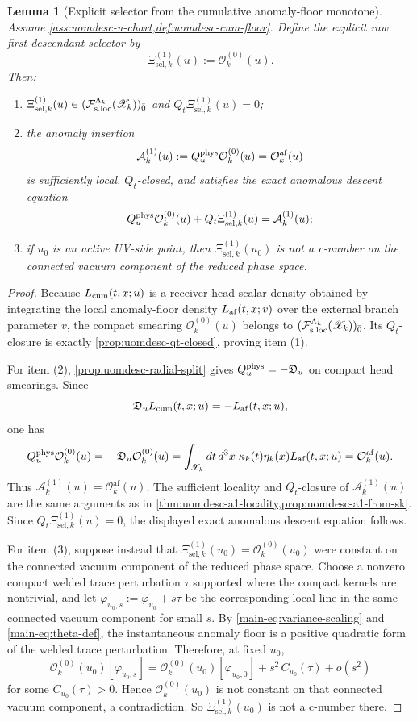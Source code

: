 \documentclass[11pt]{article}
\theoremstyle{definition}
\theoremstyle{plain}
\newtheorem{lemma}[definition]{Lemma}
\theoremstyle{remark}
\newcommand{\Fsloc}{\mathcal F_{\rm s.loc}}
\newcommand{\Xscr}{\mathscr X}
\newcommand{\Ozero}{\mathcal O^{(0)}}
\newcommand{\Oaf}{\mathcal O^{\mathrm{af}}}
\newcommand{\Aone}{\mathcal A^{(1)}}
\newcommand{\Xiselk}{\Xi^{(1)}_{\mathrm{sel},k}}
\newcommand{\Qt}{Q_t}
\newcommand{\Du}{\mathfrak D_u}
\newcommand{\Quphys}{Q_u^{\rm phys}}
\begin{document}
\begin{lemma}[Explicit selector from the cumulative anomaly-floor monotone]
\label{lem:uomdesc-cum-selector}
Assume \cref{ass:uomdesc-u-chart,def:uomdesc-cum-floor}.
Define the explicit raw first-descendant selector by
\[
\Xiselk(u):=\Ozero_k(u).
\]
Then:
\begin{enumerate}[leftmargin=2em]
\item \(\Xiselk(u)\in(\Fsloc^{\Lambda_k}(\Xscr_k))_{\bar 0}\) and
  \(\Qt\Xiselk(u)=0\);
\item the anomaly insertion
  \[
  \Aone_k(u):=\Quphys\Ozero_k(u)=\Oaf_k(u)
  \]
  is sufficiently local, \(Q_t\)-closed, and satisfies the exact anomalous descent equation
  \[
  \Quphys\Ozero_k(u)+\Qt\Xiselk(u)=\Aone_k(u);
  \]
\item if \(u_0\) is an active UV-side point, then
  \(\Xiselk(u_0)\) is not a c-number on the connected vacuum component of the
  reduced phase space.
\end{enumerate}
\end{lemma}

\begin{proof}
Because \(L_{\rm cum}(t,x;u)\) is a receiver-head scalar density obtained by integrating the local
anomaly-floor density \(L_{\rm af}(t,x;v)\) over the external branch parameter \(v\), the compact
smearing \(\Ozero_k(u)\) belongs to \((\Fsloc^{\Lambda_k}(\Xscr_k))_{\bar 0}\). Its \(\Qt\)-closure
is exactly \cref{prop:uomdesc-qt-closed}, proving item (1).

For item (2), \cref{prop:uomdesc-radial-split} gives \(\Quphys=-\Du\) on compact head smearings.
Since
\[
\Du L_{\rm cum}(t,x;u)=-L_{\rm af}(t,x;u),
\]
one has
\[
\Quphys\Ozero_k(u)
=
-\,\Du\Ozero_k(u)
=
\int_{\Xscr_k}dt\,d^3x\;
\kappa_k(t)\eta_k(x)L_{\rm af}(t,x;u)
=
\Oaf_k(u).
\]
Thus \(\Aone_k(u)=\Oaf_k(u)\). The sufficient locality and \(Q_t\)-closure of \(\Aone_k(u)\) are
the same arguments as in \cref{thm:uomdesc-a1-locality,prop:uomdesc-a1-from-sk}. Since
\(\Qt\Xiselk(u)=0\), the displayed exact anomalous descent equation follows.

For item (3), suppose instead that \(\Xiselk(u_0)=\Ozero_k(u_0)\) were constant on
the connected vacuum component of the reduced phase space.
Choose a nonzero compact welded trace perturbation \(\tau\) supported where the compact kernels are
nontrivial, and let \(\varphi_{u_0,s}:=\varphi_{u_0}+s\tau\) be the corresponding local line in the
same connected vacuum component for small \(s\).
By \eqref{main-eq:variance-scaling} and \eqref{main-eq:theta-def}, the instantaneous anomaly floor
is a
positive quadratic form of the welded trace perturbation.
Therefore, at fixed \(u_0\),
\[
\Ozero_k(u_0)[\varphi_{u_0,s}]
=
\Ozero_k(u_0)[\varphi_{u_0,0}]
+
s^2\,C_{u_0}(\tau)
+
o(s^2)
\]
for some \(C_{u_0}(\tau)>0\).
Hence \(\Ozero_k(u_0)\) is not constant on that connected vacuum component, a contradiction.
So \(\Xiselk(u_0)\) is not a c-number there.
\end{proof}
\end{document}
